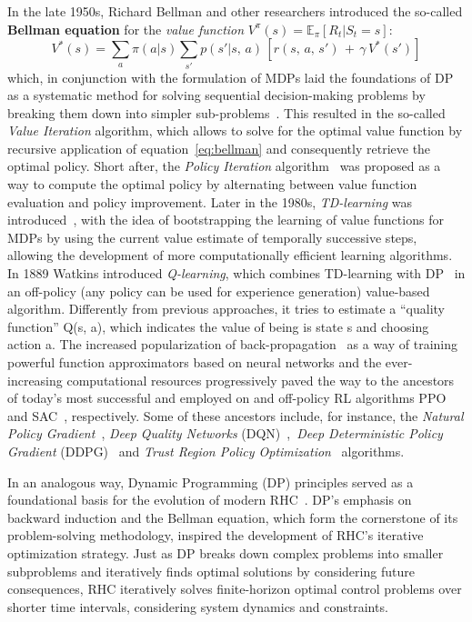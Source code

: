 In the late 1950s, Richard Bellman and other researchers introduced the so-called \textbf{Bellman equation} for the \textit{value function} $V^{\pi}(s) = \mathbb{E}_\pi [R_t|S_t=s]$:
\begin{equation}\label{eq:bellman}
	V^{*}(s) = \sum_{a} \pi(a|s) \sum_{s'} p(s'|s,\,a) \,[r(s,\,a,\,s')\,+\,\gamma\,V^{*}(s')]
\end{equation}
which, in conjunction with the formulation of MDPs laid the foundations of DP as a systematic method for solving sequential decision-making problems by breaking them down into simpler sub-problems~\cite{rl:bellman1960dynamic}. This resulted in the so-called \textit{Value Iteration} algorithm, which allows to solve for the optimal value function by recursive application of equation~\eqref{eq:bellman} and consequently retrieve the optimal policy. Short after, the \textit{Policy Iteration} algorithm~\cite{rl:howard1960dynamic} was proposed as a way to compute the optimal policy by alternating between value function evaluation and policy improvement. Later in the 1980s, \textit{TD-learning} was introduced~\cite{rl:barto1983neuronlike}, with the idea of bootstrapping the learning of value functions for MDPs by
using the current value estimate of temporally successive steps, allowing the development of more computationally efficient learning algorithms. In 1889 Watkins introduced \textit{Q-learning}, which combines TD-learning with DP~\cite{rl:watkins1989learning} in an off-policy (any policy can be used for experience generation) value-based algorithm. Differently from previous approaches, it tries to estimate a ``quality function'' Q(s, a), which indicates the value of being is state s and choosing action a. The increased popularization of back-propagation~\cite{rl:rumelhart1986learning} as a way of training powerful function approximators based on neural networks and the ever-increasing computational resources progressively paved the way to the ancestors of today's most successful and employed on and off-policy RL algorithms PPO~\cite{rl:schulman2017proximal} and SAC~\cite{rl:haarnoja2018soft}, respectively. Some of these ancestors include, for instance, the \textit{Natural Policy Gradient}~\cite{rl:kakade2001natural}, \textit{Deep Quality Networks} (DQN)~\cite{rl:mnih2015human},~\textit{Deep Deterministic Policy Gradient} (DDPG)~\cite{rl:lillicrap2015continuous} and \textit{Trust Region Policy Optimization}~\cite{rl:schulman2015trust} algorithms.

In an analogous way, Dynamic Programming (DP) principles served as a foundational basis for the evolution of modern RHC~\cite{modern_mpc:grandia2023perceptive}.
DP's emphasis on backward induction and the Bellman equation, which form the cornerstone of its problem-solving methodology, inspired the development of RHC's iterative optimization strategy. Just as DP breaks down complex problems into smaller subproblems and iteratively finds optimal solutions by considering future consequences, RHC iteratively solves finite-horizon optimal control problems over shorter time intervals, considering system dynamics and constraints. 

